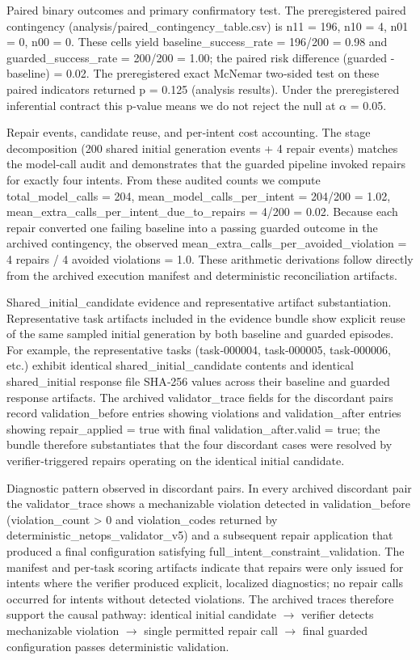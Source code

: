 \documentclass[conference]{IEEEtran}
\begin{document}
Paired binary outcomes and primary confirmatory test. The preregistered paired contingency (analysis/paired\_contingency\_table.csv) is n11 = 196, n10 = 4, n01 = 0, n00 = 0. These cells yield baseline\_success\_rate = 196/200 = 0.98 and guarded\_success\_rate = 200/200 = 1.00; the paired risk difference (guarded - baseline) = 0.02. The preregistered exact McNemar two‑sided test on these paired indicators returned p = 0.125 (analysis results). Under the preregistered inferential contract this p‑value means we do not reject the null at \ensuremath{\alpha} = 0.05.

Repair events, candidate reuse, and per‑intent cost accounting. The stage decomposition (200 shared initial generation events + 4 repair events) matches the model‑call audit and demonstrates that the guarded pipeline invoked repairs for exactly four intents. From these audited counts we compute total\_model\_calls = 204, mean\_model\_calls\_per\_intent = 204/200 = 1.02, mean\_extra\_calls\_per\_intent\_due\_to\_repairs = 4/200 = 0.02. Because each repair converted one failing baseline into a passing guarded outcome in the archived contingency, the observed mean\_extra\_calls\_per\_avoided\_violation = 4 repairs / 4 avoided violations = 1.0. These arithmetic derivations follow directly from the archived execution manifest and deterministic reconciliation artifacts.

Shared\_initial\_candidate evidence and representative artifact substantiation. Representative task artifacts included in the evidence bundle show explicit reuse of the same sampled initial generation by both baseline and guarded episodes. For example, the representative tasks (task‑000004, task‑000005, task‑000006, etc.) exhibit identical shared\_initial\_candidate contents and identical shared\_initial response file SHA‑256 values across their baseline and guarded response artifacts. The archived validator\_trace fields for the discordant pairs record validation\_before entries showing violations and validation\_after entries showing repair\_applied = true with final validation\_after.valid = true; the bundle therefore substantiates that the four discordant cases were resolved by verifier‑triggered repairs operating on the identical initial candidate.

Diagnostic pattern observed in discordant pairs. In every archived discordant pair the validator\_trace shows a mechanizable violation detected in validation\_before (violation\_count > 0 and violation\_codes returned by deterministic\_netops\_validator\_v5) and a subsequent repair application that produced a final configuration satisfying full\_intent\_constraint\_validation. The manifest and per‑task scoring artifacts indicate that repairs were only issued for intents where the verifier produced explicit, localized diagnostics; no repair calls occurred for intents without detected violations. The archived traces therefore support the causal pathway: identical initial candidate \ensuremath{\rightarrow} verifier detects mechanizable violation \ensuremath{\rightarrow} single permitted repair call \ensuremath{\rightarrow} final guarded configuration passes deterministic validation.
\end{document}
